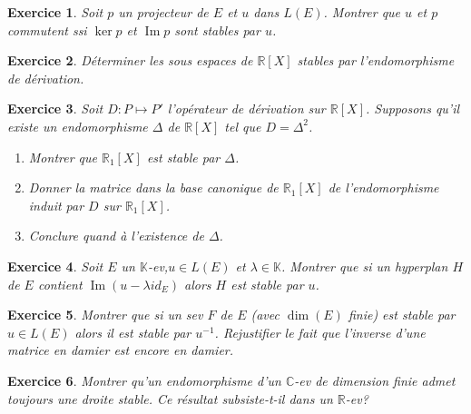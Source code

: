 \documentclass[12pt,a4paper]{article}
\newcommand{\R}{\mathbb{R}}
\newcommand{\C}{\mathbb{C}}
\newcommand{\K}{\mathbb{K} }
\DeclareMathOperator{\Ima }{Im}
\theoremstyle{break}
\theoremstyle{break}
\newtheorem{Exo}{Exercice}
\begin{document}
\begin{Exo}
	Soit $p$ un projecteur de $E$ et $u$ dans $L(E)$. Montrer que $u$ et $p$ commutent ssi $\ker p$ et $\Ima p$ sont stables par $u$.
\end{Exo}

\begin{Exo}
	Déterminer les sous espaces de $\R[X]$ stables par l'endomorphisme de dérivation.
\end{Exo}



\begin{Exo}
	Soit $D:P\mapsto P'$ l'opérateur de dérivation sur $\R[X]$. Supposons qu'il existe un endomorphisme $\Delta$ de $\R[X]$ tel que $D=\Delta^2$.
	\begin{enumerate}
		\item
		Montrer que  $\R_1[X]$ est stable par $\Delta$.
		\item Donner la matrice dans la base canonique de $\R_1[X]$ de l'endomorphisme induit par $D$ sur $\R_1[X]$.
		\item Conclure quand à l'existence de $\Delta$.
	\end{enumerate}
\end{Exo}

\begin{Exo}
	Soit $E$ un $\K$-ev,$u\in L(E)$ et $\lambda \in \K$. Montrer que si un hyperplan $H$ de $E$ contient $\Ima(u-\lambda id_E)$ alors $H$ est stable par $u$.
\end{Exo}

\begin{Exo}
	Montrer que si un sev $F$ de $E$ (avec $\dim(E)$ finie) est stable par $u\in L(E)$ alors il est stable par $u^{-1}$. Rejustifier le fait que l'inverse d'une matrice en damier est encore en damier.
\end{Exo}
%
\begin{Exo}
	Montrer qu'un endomorphisme d'un $\C$-ev de dimension finie admet toujours une droite stable. Ce résultat subsiste-t-il dans un $\R$-ev?
\end{Exo}
\end{document}
